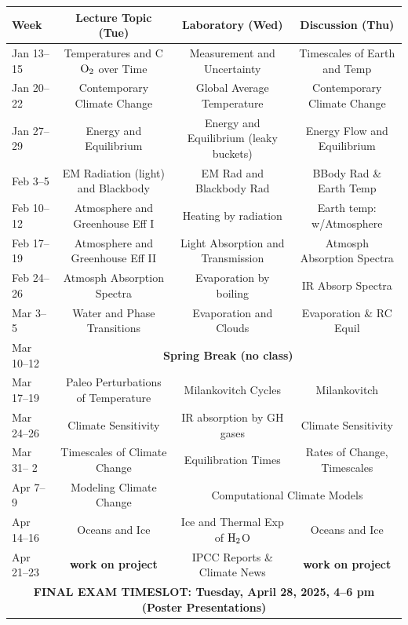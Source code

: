 \documentclass{article}
\begin{document}
\renewcommand{\arraystretch}{1.5}
\hspace{-1.7cm}%
\begin{tabular}{|l|c|c|c|}
\hline
{\bf Week}  & {\bf Lecture Topic (Tue)} & {\bf Laboratory (Wed)} &  {\bf Discussion (Thu)} \\
\hline
\hline
Jan 13--15 & Temperatures and C${\rm O}_2$ over Time & Measurement and Uncertainty & Timescales of Earth and  Temp \\
\hline
Jan 20--22 & Contemporary Climate Change & Global Average Temperature & Contemporary Climate Change \\
\hline
Jan 27--29 & Energy and Equilibrium & Energy and Equilibrium (leaky buckets)& Energy Flow and Equilibrium \\
\hline
Feb 3--5 & EM Radiation (light) and Blackbody & EM Rad and Blackbody Rad & BBody Rad \& Earth Temp \\
\hline
Feb 10--12  & Atmosphere and Greenhouse Eff I &  Heating by radiation & Earth temp:  w/Atmosphere \\
\hline
Feb 17--19 & Atmosphere and Greenhouse Eff II & Light Absorption and Transmission& Atmosph Absorption Spectra \\
\hline
Feb 24--26 & Atmosph Absorption Spectra &  Evaporation by boiling & IR Absorp Spectra \\
\hline
Mar 3--5 & Water and Phase Transitions & Evaporation and Clouds & Evaporation \& RC Equil\\
\hline
Mar 10--12  & \multicolumn{3}{|c|}{\bf Spring Break (no class)}  \\
\hline
Mar 17--19 & Paleo Perturbations of Temperature & Milankovitch Cycles & Milankovitch \\
\hline
Mar 24--26 & Climate Sensitivity & IR absorption by GH gases  & Climate Sensitivity \\
\hline
Mar 31-- 2& Timescales of Climate Change & Equilibration Times  & Rates of Change, Timescales \\
\hline
Apr 7--9  & Modeling Climate Change & \multicolumn{2}{|c|}{Computational Climate Models} \\
\hline
Apr 14--16 & Oceans and Ice & Ice and Thermal Exp of ${\rm H}_2$O  & Oceans and Ice \\
\hline
Apr 21--23  &  {\bf work on project}  &  IPCC Reports \& Climate News  & {\bf work on project} \\
\hline
\multicolumn{4}{|c|}{\bf FINAL EXAM TIMESLOT: Tuesday, April 28, 2025, 4--6 pm (Poster Presentations)}\\
\hline
\end{tabular}


\pagestyle{empty}
\end{document}
